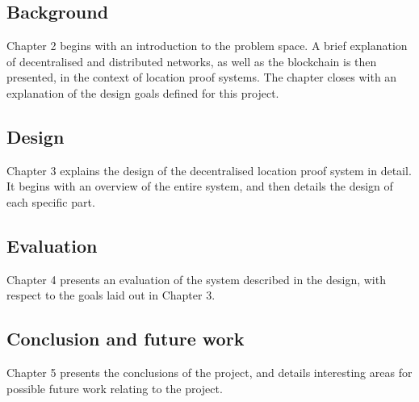\subsection{Background}
Chapter 2 begins with an introduction to the problem space. A brief explanation of decentralised and distributed networks, as well as the blockchain is then presented, in the context of location proof systems. The chapter closes with an explanation of the design goals defined for this project.

\subsection{Design}
Chapter 3 explains the design of the decentralised location proof system in detail. It begins with an overview of the entire system, and then details the design of each specific part.

\subsection{Evaluation}
Chapter 4 presents an evaluation of the system described in the design, with respect to the goals laid out in Chapter 3.

\subsection{Conclusion and future work}
Chapter 5 presents the conclusions of the project, and details interesting areas for possible future work relating to the project.